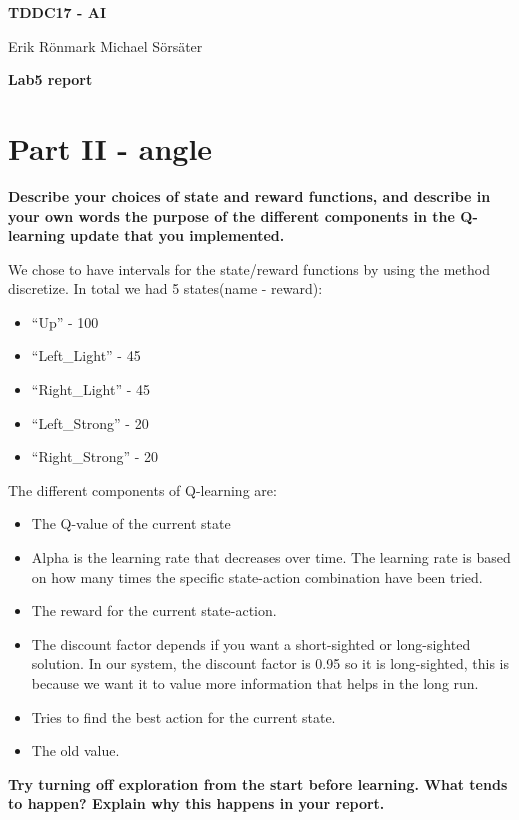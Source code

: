 \documentclass[12pt,a4paper]{article}
\begin{document}
\begin{center}
    \Huge
    \textbf{TDDC17 - AI}

    \vspace{0.3cm}
    \Large
    Erik Rönmark
    Michael Sörsäter
    
    \vspace{0.7cm}
    \textbf{Lab5 report}
\end{center}

\section{Part II - angle}
\textbf{Describe your choices of state and reward functions, and describe in your own words the purpose of the different components in the Q-learning update that you implemented.}

We chose to have intervals for the state/reward functions by using the method discretize. In total we had 5 states(name - reward):

\begin{itemize}
\item ``Up'' - 100
\item``Left\_Light'' - 45
\item``Right\_Light'' - 45
\item``Left\_Strong'' - 20
\item``Right\_Strong'' - 20
\end{itemize}

The different components of Q-learning are:
\begin{itemize}
\item The Q-value of the current state
\item Alpha is the learning rate that decreases over time. The learning rate is based on how many times the specific state-action combination have been tried.
\item The reward for the current state-action.
\item The discount factor depends if you want a short-sighted or long-sighted solution. In our system, the discount factor is 0.95 so it is long-sighted, this is because we want it to value more information that helps in the long run. 
\item Tries to find the best action for the current state.
\item The old value.
\end{itemize}						
													
\textbf{Try turning off exploration from the start before learning. What tends to happen? Explain why this happens in your report.}
\end{document}
